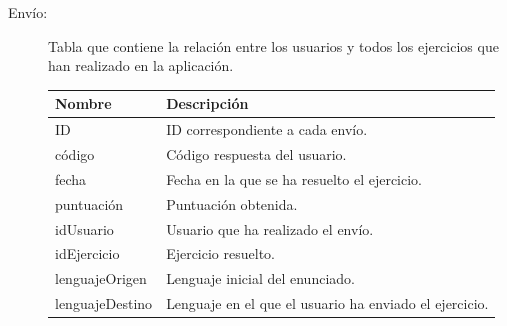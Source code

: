 \begin{description}
\item[Envío:] Tabla que contiene la relación entre los usuarios y todos los ejercicios que han realizado en la aplicación.

\begin{tabularx}{14cm}{|l|X|}
\hline
\textbf{Nombre} & \textbf{Descripción}                                                              \\ \hline
ID       & ID correspondiente a cada envío. \\ \hline
código     & Código respuesta del usuario.                                           \\ \hline
fecha     & Fecha en la que se ha resuelto el ejercicio.                                           \\ \hline
puntuación     & Puntuación obtenida.                                           \\ \hline
idUsuario     & Usuario que ha realizado el envío.                                           \\ \hline
idEjercicio     & Ejercicio resuelto.                                           \\ \hline
lenguajeOrigen     & Lenguaje inicial del enunciado.                                           \\ \hline
lenguajeDestino     & Lenguaje en el que el usuario ha enviado el ejercicio.                                           \\ \hline
\end{tabularx}

\end{description}